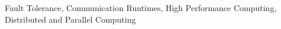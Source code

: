\begin{center}
Fault Tolerance, 
Communication Runtimes, 
High Performance Computing,
Distributed and Parallel Computing
\end{center} 
